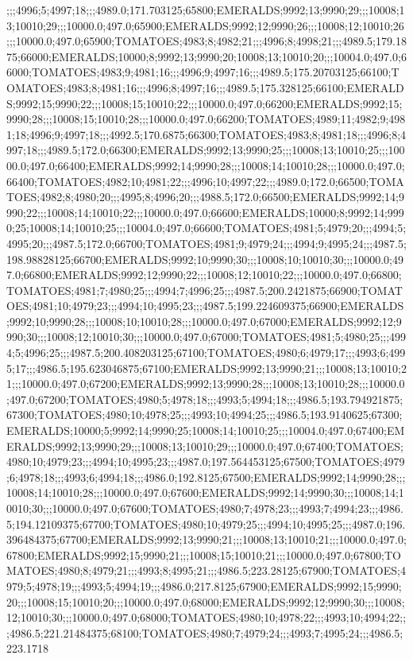 ;;;4996;5;4997;18;;;4989.0;171.703125;65800;EMERALDS;9992;13;9990;29;;;10008;13;10010;29;;;10000.0;497.0;65900;EMERALDS;9992;12;9990;26;;;10008;12;10010;26;;;10000.0;497.0;65900;TOMATOES;4983;8;4982;21;;;4996;8;4998;21;;;4989.5;179.1875;66000;EMERALDS;10000;8;9992;13;9990;20;10008;13;10010;20;;;10004.0;497.0;66000;TOMATOES;4983;9;4981;16;;;4996;9;4997;16;;;4989.5;175.20703125;66100;TOMATOES;4983;8;4981;16;;;4996;8;4997;16;;;4989.5;175.328125;66100;EMERALDS;9992;15;9990;22;;;10008;15;10010;22;;;10000.0;497.0;66200;EMERALDS;9992;15;9990;28;;;10008;15;10010;28;;;10000.0;497.0;66200;TOMATOES;4989;11;4982;9;4981;18;4996;9;4997;18;;;4992.5;170.6875;66300;TOMATOES;4983;8;4981;18;;;4996;8;4997;18;;;4989.5;172.0;66300;EMERALDS;9992;13;9990;25;;;10008;13;10010;25;;;10000.0;497.0;66400;EMERALDS;9992;14;9990;28;;;10008;14;10010;28;;;10000.0;497.0;66400;TOMATOES;4982;10;4981;22;;;4996;10;4997;22;;;4989.0;172.0;66500;TOMATOES;4982;8;4980;20;;;4995;8;4996;20;;;4988.5;172.0;66500;EMERALDS;9992;14;9990;22;;;10008;14;10010;22;;;10000.0;497.0;66600;EMERALDS;10000;8;9992;14;9990;25;10008;14;10010;25;;;10004.0;497.0;66600;TOMATOES;4981;5;4979;20;;;4994;5;4995;20;;;4987.5;172.0;66700;TOMATOES;4981;9;4979;24;;;4994;9;4995;24;;;4987.5;198.98828125;66700;EMERALDS;9992;10;9990;30;;;10008;10;10010;30;;;10000.0;497.0;66800;EMERALDS;9992;12;9990;22;;;10008;12;10010;22;;;10000.0;497.0;66800;TOMATOES;4981;7;4980;25;;;4994;7;4996;25;;;4987.5;200.2421875;66900;TOMATOES;4981;10;4979;23;;;4994;10;4995;23;;;4987.5;199.224609375;66900;EMERALDS;9992;10;9990;28;;;10008;10;10010;28;;;10000.0;497.0;67000;EMERALDS;9992;12;9990;30;;;10008;12;10010;30;;;10000.0;497.0;67000;TOMATOES;4981;5;4980;25;;;4994;5;4996;25;;;4987.5;200.408203125;67100;TOMATOES;4980;6;4979;17;;;4993;6;4995;17;;;4986.5;195.623046875;67100;EMERALDS;9992;13;9990;21;;;10008;13;10010;21;;;10000.0;497.0;67200;EMERALDS;9992;13;9990;28;;;10008;13;10010;28;;;10000.0;497.0;67200;TOMATOES;4980;5;4978;18;;;4993;5;4994;18;;;4986.5;193.794921875;67300;TOMATOES;4980;10;4978;25;;;4993;10;4994;25;;;4986.5;193.9140625;67300;EMERALDS;10000;5;9992;14;9990;25;10008;14;10010;25;;;10004.0;497.0;67400;EMERALDS;9992;13;9990;29;;;10008;13;10010;29;;;10000.0;497.0;67400;TOMATOES;4980;10;4979;23;;;4994;10;4995;23;;;4987.0;197.564453125;67500;TOMATOES;4979;6;4978;18;;;4993;6;4994;18;;;4986.0;192.8125;67500;EMERALDS;9992;14;9990;28;;;10008;14;10010;28;;;10000.0;497.0;67600;EMERALDS;9992;14;9990;30;;;10008;14;10010;30;;;10000.0;497.0;67600;TOMATOES;4980;7;4978;23;;;4993;7;4994;23;;;4986.5;194.12109375;67700;TOMATOES;4980;10;4979;25;;;4994;10;4995;25;;;4987.0;196.396484375;67700;EMERALDS;9992;13;9990;21;;;10008;13;10010;21;;;10000.0;497.0;67800;EMERALDS;9992;15;9990;21;;;10008;15;10010;21;;;10000.0;497.0;67800;TOMATOES;4980;8;4979;21;;;4993;8;4995;21;;;4986.5;223.28125;67900;TOMATOES;4979;5;4978;19;;;4993;5;4994;19;;;4986.0;217.8125;67900;EMERALDS;9992;15;9990;20;;;10008;15;10010;20;;;10000.0;497.0;68000;EMERALDS;9992;12;9990;30;;;10008;12;10010;30;;;10000.0;497.0;68000;TOMATOES;4980;10;4978;22;;;4993;10;4994;22;;;4986.5;221.21484375;68100;TOMATOES;4980;7;4979;24;;;4993;7;4995;24;;;4986.5;223.1718